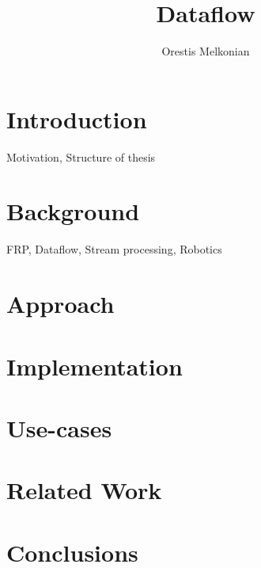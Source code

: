 \documentclass[a4]{report}
\begin{document}
\title{Dataflow}
\author{Orestis Melkonian}

\maketitle

\begin{abstract}
\end{abstract}

\tableofcontents

\chapter{Introduction}
Motivation, Structure of thesis

\chapter{Background}
FRP, Dataflow, Stream processing, Robotics

\chapter{Approach}

\chapter{Implementation}

\chapter{Use-cases}

\chapter{Related Work}

\chapter{Conclusions}



\end{document}
